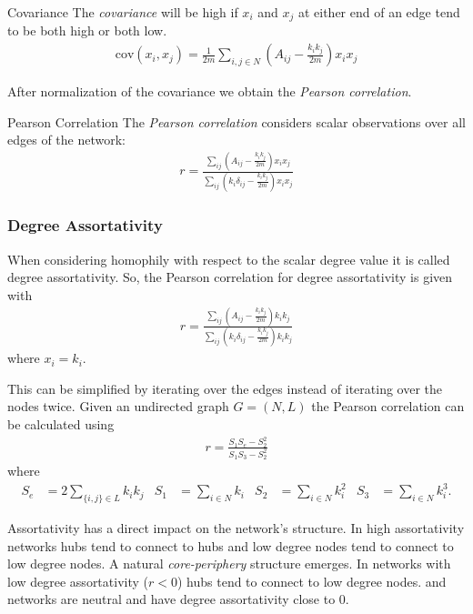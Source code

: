 \documentclass[english]{panikzettel}
\begin{document}
\begin{defi}{Covariance}
The \emph{covariance} will be high if $ x_i $ and $ x_j $ at either end of an edge tend to be both high or both low.
\begin{align*}
	\text{cov} (x_i, x_j) = \frac{1}{2m} \sum\limits_{i,j \in N} \left(A_{ij} - \frac{k_i k_j}{2m}\right) x_i x_j
\end{align*}
\end{defi}

After normalization of the covariance we obtain the \textit{Pearson correlation}.

\begin{defi}{Pearson Correlation}
The \emph{Pearson correlation} considers scalar observations over all edges of the network:
\begin{align*}
	r = \frac{\sum_{ij} (A_{ij} - \frac{k_i k_j}{2m}) x_i x_j}{\sum_{ij} (k_i \delta_{ij} - \frac{k_i k_j}{2m}) x_i x_j}
\end{align*}
\end{defi}

\subsubsection{Degree Assortativity}
When considering homophily with respect to the scalar degree value it is called degree assortativity.
So, the Pearson correlation for degree assortativity is given with
\begin{align*}
	r = \frac{\sum_{ij} (A_{ij} - \frac{k_i k_j}{2m}) k_i k_j}{\sum_{ij} (k_i \delta_{ij} - \frac{k_i k_j}{2m}) k_i k_j}
\end{align*}
where $ x_i = k_i $.

This can be simplified by iterating over the edges instead of iterating over the nodes twice. Given an undirected graph $ G = (N,L) $ the Pearson correlation can be calculated using
\begin{align*}
	r = \frac{S_1 S_e - S_2^2}{S_1 S_3 - S_2^2}
\end{align*}
where
\begin{align*}
	S_e &= 2 \sum\limits_{\{i,j\} \in L} k_i k_j & S_1 &= \sum\limits_{i \in N} k_i & S_2 &= \sum\limits_{i \in N} k_i^2 & S_3 &= \sum\limits_{i \in N} k_i^3.
\end{align*}

Assortativity has a direct impact on the network's structure.
In high assortativity networks hubs tend to connect to hubs and low degree nodes tend to connect to low degree nodes.
A natural \textit{core-periphery} structure emerges.
In networks with low degree assortativity ($ r < 0 $) hubs tend to connect to low degree nodes.
\hyperref[sec:erdosrenyi_model]{\erdosrenyi} and \hyperref[sec:barabasi_albert_model]{\barabasi} networks are neutral and have degree assortativity close to 0.
\end{document}
